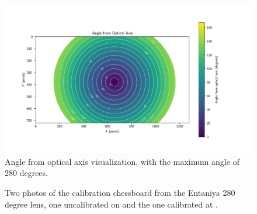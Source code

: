 \begin{figure}[H]
	\centering
	\includegraphics[width=1.0\textwidth]{./fig/pgfplot/viz_ent.pdf}
	\caption{Angle from optical axis visualization, with the maximum angle of 280 degrees.}
	\label{fig:calib_ent_viz}
\end{figure}

\begin{figure}[H]
	\centering
	\caption{
		Two photos of the calibration chessboard from the Entaniya 280 degree lens, one uncalibrated on  and the one calibrated at .
  }
	\label{fig:calib_ent_proj}
\end{figure}